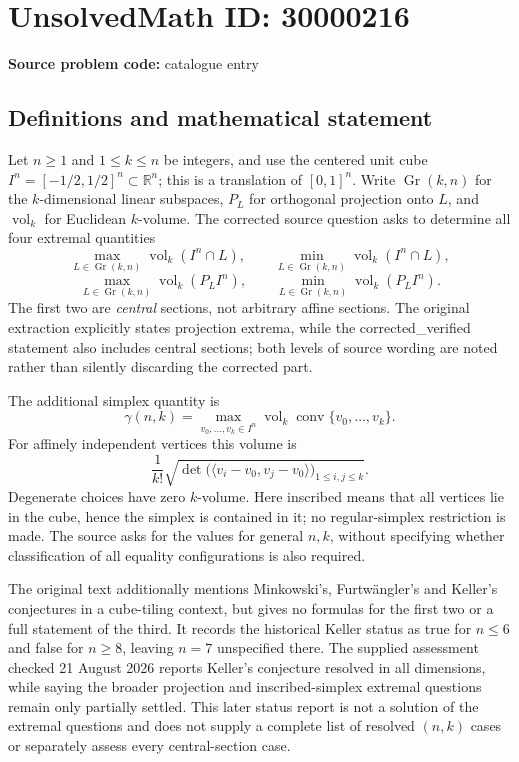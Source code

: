 \documentclass[11pt]{article}
\newcommand{\R}{\mathbb{R}}
\begin{document}
\section*{UnsolvedMath ID: 30000216}
\textbf{Source problem code:} catalogue entry
\subsection{Definitions and mathematical statement}
Let $n\geq1$ and $1\leq k\leq n$ be integers, and use the centered unit cube $I^n=[-1/2,1/2]^n\subset\R^n$; this is a translation of $[0,1]^n$. Write $\operatorname{Gr}(k,n)$ for the $k$-dimensional linear subspaces, $P_L$ for orthogonal projection onto $L$, and $\operatorname{vol}_k$ for Euclidean $k$-volume. The corrected source question asks to determine all four extremal quantities
\[
 \max_{L\in\operatorname{Gr}(k,n)}\operatorname{vol}_k(I^n\cap L),\qquad
 \min_{L\in\operatorname{Gr}(k,n)}\operatorname{vol}_k(I^n\cap L),
\]
\[
 \max_{L\in\operatorname{Gr}(k,n)}\operatorname{vol}_k(P_LI^n),\qquad
 \min_{L\in\operatorname{Gr}(k,n)}\operatorname{vol}_k(P_LI^n).
\]
The first two are \emph{central} sections, not arbitrary affine sections. The original extraction explicitly states projection extrema, while the corrected\_verified statement also includes central sections; both levels of source wording are noted rather than silently discarding the corrected part.

The additional simplex quantity is
\[
 \gamma(n,k)=\max_{v_0,\ldots,v_k\in I^n}
 \operatorname{vol}_k\operatorname{conv}\{v_0,\ldots,v_k\}.
\]
For affinely independent vertices this volume is
\[
 \frac1{k!}\sqrt{\det\bigl(\langle v_i-v_0,v_j-v_0\rangle\bigr)_{1\leq i,j\leq k}}.
\]
Degenerate choices have zero $k$-volume. Here inscribed means that all vertices lie in the cube, hence the simplex is contained in it; no regular-simplex restriction is made. The source asks for the values for general $n,k$, without specifying whether classification of all equality configurations is also required.

The original text additionally mentions Minkowski's, Furtw\"angler's and Keller's conjectures in a cube-tiling context, but gives no formulas for the first two or a full statement of the third. It records the historical Keller status as true for $n\leq6$ and false for $n\geq8$, leaving $n=7$ unspecified there. The supplied assessment checked 21 August 2026 reports Keller's conjecture resolved in all dimensions, while saying the broader projection and inscribed-simplex extremal questions remain only partially settled. This later status report is not a solution of the extremal questions and does not supply a complete list of resolved $(n,k)$ cases or separately assess every central-section case.
\end{document}
